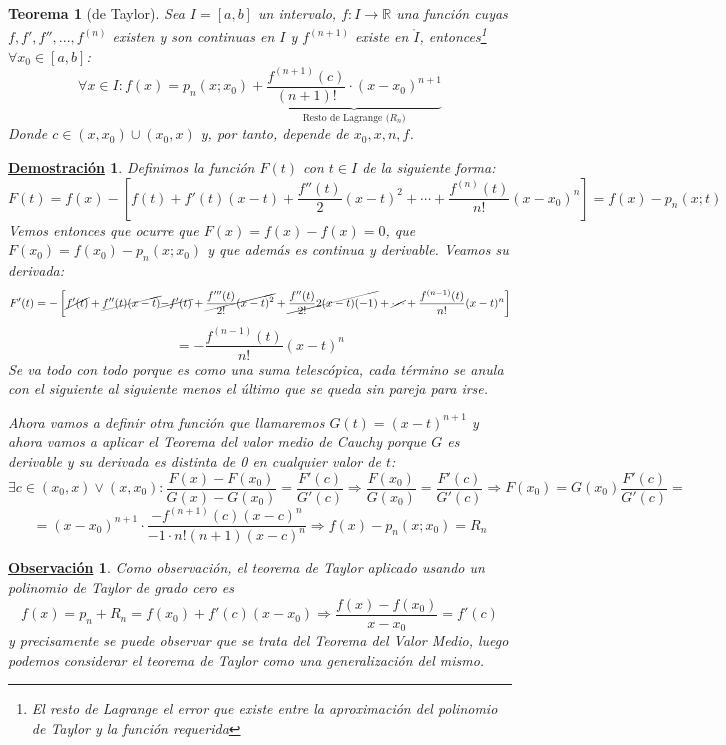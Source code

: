 \documentclass[10pt,a4paper,openright]{book}
\theoremstyle{break}
\newtheorem{theo}{Teorema}[chapter]
\newtheorem*{demo}{\underline{Demostración}}
\newtheorem{obs}{\underline{Observación}}[chapter]
\begin{document}
\begin{theo}[de Taylor]
Sea $I=[a,b]$ un intervalo, $f:I\rightarrow \mathbb R$ una función cuyas $f,f',f'', ..., f^{(n)}$ existen y son continuas en $I$ y $f^{(n+1)}$ existe en $\mathring{I}$, entonces\footnote{El resto de Lagrange el error que existe entre la aproximación del polinomio de Taylor y la función requerida} $\forall x_0 \in [a,b]$:
$$\forall x\in I: f(x)=p_n(x; x_0)+\underbrace{\frac{f^{(n+1)}(c)}{(n+1)!}\cdot (x-x_0)^{n+1}}_{\text{Resto de Lagrange ($R_n$)}}$$
Donde $c\in (x,x_0)\cup (x_0, x)$ y, por tanto, depende de $x_0, x, n, f$.
\end{theo}
\begin{demo}
Definimos la función $F(t)$ con $t\in I$ de la siguiente forma:
$$F(t)=f(x)-\left[f(t)+f'(t)(x-t)+\frac{f''(t)}{2}(x-t)^2+\cdots + \frac{f^{(n)}(t)}{n!}(x-x_0)^n\right]=f(x)-p_n(x;t)$$
Vemos entonces que ocurre que $F(x)=f(x)-f(x)=0$, que $F(x_0)=f(x_0)-p_n(x;x_0)$ y que además es continua y derivable. Veamos su derivada:
$$F'(t)=-\left[\cancel{f'(t)}+\cancel{f''(t)(x-t)}\cancel{-f'(t)}+\cancel{\frac{f'''(t)}{2!}(x-t)^2}+\cancel{\frac{f''(t)}{2!}2(x-t)(-1)}+\cancel{\cdots} +  \frac{f^{(n-1)}(t)}{n!}(x-t)^n\right] $$
$$= -\frac{f^{(n-1)}(t)}{n!}(x-t)^n$$
Se va todo con todo porque es como una suma telescópica, cada término se anula con el siguiente al siguiente menos el último que se queda sin pareja para irse.

Ahora vamos a definir otra función que llamaremos $G(t)=(x-t)^{n+1}$ y ahora vamos a aplicar el Teorema del valor medio de Cauchy porque $G$ es derivable y su derivada es distinta de 0 en cualquier valor de $t$:
$$\exists c \in (x_0,x)\vee (x,x_0): \frac{F(x)-F(x_0)}{G(x)-G(x_0)}=\frac{F'(c)}{G'(c)}\Rightarrow \frac{F(x_0)}{G(x_0)}=\frac{F'(c)}{G'(c)}\Rightarrow F(x_0)=G(x_0)\frac{F'(c)}{G'(c)}=$$
$$=(x-x_0)^{n+1}\cdot \frac{-f^{(n+1)}(c)(x-c)^n}{-1\cdot n!(n+1)(x-c)^n}\Rightarrow f(x)-p_n(x;x_0)=R_n$$
\end{demo}

\begin{obs}
Como observación, el teorema de Taylor aplicado usando un polinomio de Taylor de grado cero es
\[
f(x)=p_n+R_n=f(x_0)+f'(c)(x-x_0)\Rightarrow \frac{f(x)-f(x_0)}{x-x_0}=f'(c)
\]
y precisamente se puede observar que se trata del \textit{Teorema del Valor Medio}, luego podemos considerar el teorema de Taylor como una generalización del mismo.
\end{obs}
\end{document}

